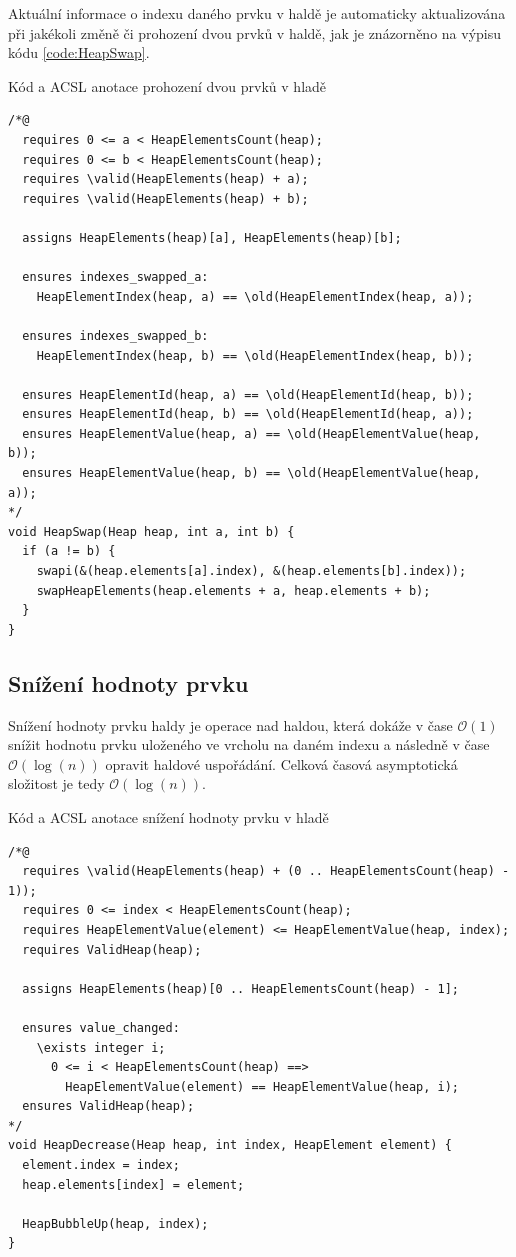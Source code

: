 Aktuální informace o indexu daného prvku v haldě je automaticky aktualizována při jakékoli změně či prohození dvou prvků v haldě, jak je znázorněno na výpisu kódu \ref{code:HeapSwap}.

\begin{listing}[H]
	\caption{Kód a ACSL anotace prohození dvou prvků v hladě}
	\label{code:HeapSwap}
	\begin{verbatim}
/*@
  requires 0 <= a < HeapElementsCount(heap);
  requires 0 <= b < HeapElementsCount(heap);
  requires \valid(HeapElements(heap) + a);
  requires \valid(HeapElements(heap) + b);

  assigns HeapElements(heap)[a], HeapElements(heap)[b];

  ensures indexes_swapped_a:
    HeapElementIndex(heap, a) == \old(HeapElementIndex(heap, a));

  ensures indexes_swapped_b:
    HeapElementIndex(heap, b) == \old(HeapElementIndex(heap, b));

  ensures HeapElementId(heap, a) == \old(HeapElementId(heap, b));
  ensures HeapElementId(heap, b) == \old(HeapElementId(heap, a));
  ensures HeapElementValue(heap, a) == \old(HeapElementValue(heap, b));
  ensures HeapElementValue(heap, b) == \old(HeapElementValue(heap, a));
*/
void HeapSwap(Heap heap, int a, int b) {
  if (a != b) {
    swapi(&(heap.elements[a].index), &(heap.elements[b].index));
    swapHeapElements(heap.elements + a, heap.elements + b);
  }
}
	\end{verbatim}
\end{listing}

\subsection{Snížení hodnoty prvku}
\label{subsec:HeapDecrease}

Snížení hodnoty prvku haldy je operace nad haldou, která dokáže v čase $\mathcal{O}(1)$ snížit hodnotu prvku uloženého ve vrcholu na daném indexu a následně v čase $\mathcal{O}(\log(n))$ opravit haldové uspořádání. Celková časová asymptotická složitost je tedy $\mathcal{O}(\log(n))$.

\begin{listing}[H]
	\caption{Kód a ACSL anotace snížení hodnoty prvku v hladě}
	\label{code:HeapDecrease}
	\begin{verbatim}
/*@
  requires \valid(HeapElements(heap) + (0 .. HeapElementsCount(heap) - 1));
  requires 0 <= index < HeapElementsCount(heap);
  requires HeapElementValue(element) <= HeapElementValue(heap, index);
  requires ValidHeap(heap);

  assigns HeapElements(heap)[0 .. HeapElementsCount(heap) - 1];

  ensures value_changed:
    \exists integer i;
      0 <= i < HeapElementsCount(heap) ==>
        HeapElementValue(element) == HeapElementValue(heap, i);
  ensures ValidHeap(heap);
*/
void HeapDecrease(Heap heap, int index, HeapElement element) {
  element.index = index;
  heap.elements[index] = element;

  HeapBubbleUp(heap, index);
}
	\end{verbatim}
\end{listing}

